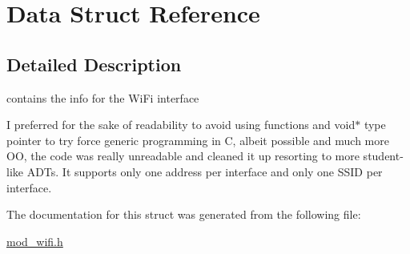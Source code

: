 \hypertarget{structData}{}\section{Data Struct Reference}
\label{structData}


\subsection{Detailed Description}
contains the info for the Wi\+Fi interface

I preferred for the sake of readability to avoid using functions and void$\ast$ type pointer to try force generic programming in C, albeit possible and much more OO, the code was really unreadable and cleaned it up resorting to more student-\/like A\+D\+Ts. It supports only one address per interface and only one S\+S\+ID per interface. 

The documentation for this struct was generated from the following file\+:\begin{DoxyCompactItemize}
\item 
\hyperlink{mod__wifi_8h}{mod\+\_\+wifi.\+h}\end{DoxyCompactItemize}
